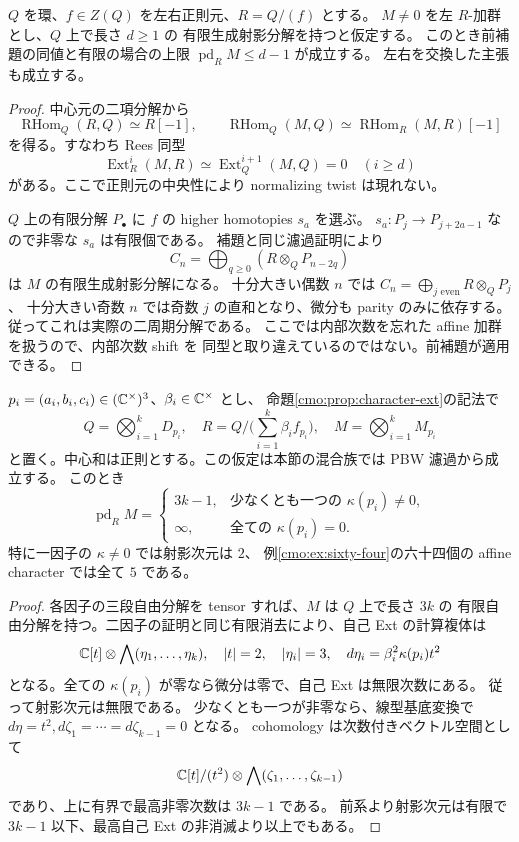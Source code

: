 \begin{corollary}
\label{cmo:cor:hypersurface-pd}
$Q$ を環、$f\in Z(Q)$ を左右正則元、$R=Q/(f)$ とする。
$M\ne0$ を左 $R$-加群とし、$Q$ 上で長さ $d\ge1$ の
有限生成射影分解を持つと仮定する。
このとき前補題の同値と有限の場合の上限 $\operatorname{pd}_R M\le d-1$ が成立する。
左右を交換した主張も成立する。
\end{corollary}
\begin{proof}
中心元の二項分解から
\[
 \operatorname{RHom}_Q(R,Q)\simeq R[-1],\qquad
 \operatorname{RHom}_Q(M,Q)\simeq
 \operatorname{RHom}_R(M,R)[-1]
\]
を得る。すなわち Rees 同型
\[
 \operatorname{Ext}_R^i(M,R)\simeq
 \operatorname{Ext}_Q^{i+1}(M,Q)=0\quad(i\ge d)
\]
がある。ここで正則元の中央性により normalizing twist は現れない。

$Q$ 上の有限分解 $P_\bullet$ に $f$ の higher homotopies $s_a$ を選ぶ。
$s_a:P_j\to P_{j+2a-1}$ なので非零な $s_a$ は有限個である。
補題と同じ濾過証明により
\[
 C_n=\bigoplus_{q\ge0}(R\otimes_QP_{n-2q})
\]
は $M$ の有限生成射影分解になる。
十分大きい偶数 $n$ では $C_n=\bigoplus_{j\text{ even}}R\otimes_QP_j$、
十分大きい奇数 $n$ では奇数 $j$ の直和となり、微分も parity のみに依存する。
従ってこれは実際の二周期分解である。
ここでは内部次数を忘れた affine 加群を扱うので、内部次数 shift を
同型と取り違えているのではない。前補題が適用できる。
\end{proof}

\begin{proposition}
\label{cmo:prop:character-pd}
$p_i=(a_i,b_i,c_i)\in(\mathbb C^\times)^3$、$\beta_i\in\mathbb C^\times$ とし、
命題\ref{cmo:prop:character-ext}の記法で
\[
 Q=\bigotimes_{i=1}^kD_{p_i},\quad
 R=Q\Big/\Big(\sum_{i=1}^k\beta_if_{p_i}\Big),\quad
 M=\bigotimes_{i=1}^kM_{p_i}
\]
と置く。中心和は正則とする。この仮定は本節の混合族では PBW 濾過から成立する。
このとき
\[
 \operatorname{pd}_R M=
 \begin{cases}
  3k-1,&\text{少なくとも一つの }\kappa(p_i)\ne0,\\
  \infty,&\text{全ての }\kappa(p_i)=0.
 \end{cases}
\]
特に一因子の $\kappa\ne0$ では射影次元は $2$、
例\ref{cmo:ex:sixty-four}の六十四個の affine character では全て $5$ である。
\end{proposition}
\begin{proof}
各因子の三段自由分解を tensor すれば、$M$ は $Q$ 上で長さ $3k$ の
有限自由分解を持つ。二因子の証明と同じ有限消去により、自己 Ext の計算複体は
\[
 \mathbb C[t]\otimes\bigwedge(\eta_1,\ldots,\eta_k),\quad
 |t|=2,\quad|\eta_i|=3,\quad d\eta_i=\beta_i^2\kappa(p_i)t^2
\]
となる。全ての $\kappa(p_i)$ が零なら微分は零で、自己 Ext は無限次数にある。
従って射影次元は無限である。
少なくとも一つが非零なら、線型基底変換で
$d\eta=t^2,d\zeta_1=\cdots=d\zeta_{k-1}=0$ となる。
cohomology は次数付きベクトル空間として
\[
 \mathbb C[t]/(t^2)\otimes\bigwedge(\zeta_1,\ldots,\zeta_{k-1})
\]
であり、上に有界で最高非零次数は $3k-1$ である。
前系より射影次元は有限で $3k-1$ 以下、最高自己 Ext の非消滅より以上でもある。
\end{proof}

